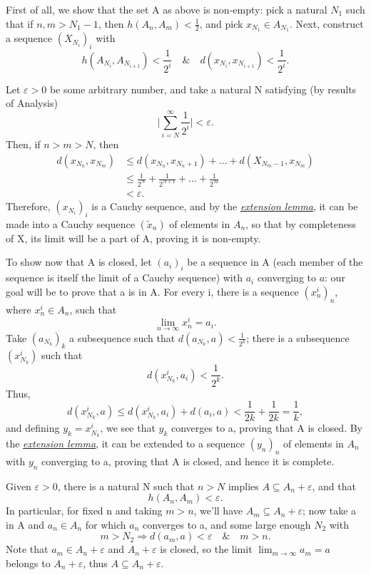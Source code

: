 \documentclass[../fractals_everywhere.tex]{subfiles}
\begin{document}
\begin{proof*}
	First of all, we show that the set A as above is non-empty: pick a natural \(N_{1}\) such that if \(n, m > N_{1}-1\), then \(h(A_{n}, A_{m}) < \frac{1}{2}\), and pick \(x_{N_{1}}\in A_{N_{1}}\). Next, construct a sequence \((X_{N_i})_{i}\) with
	\[
		h(A_{N_{i}}, A_{N_{i+1}}) < \frac{1}{2^{i}} \quad\&\quad d(x_{N_{i}}, x_{N_{i+1}}) < \frac{1}{2^{i}}.
	\]

	Let \(\varepsilon > 0\) be some arbitrary number, and take a natural N satisfying (by results of Analysis)
	\[
		\biggl\vert \sum\limits_{i=N}^{\infty}\frac{1}{2^{i}} \biggr\vert < \varepsilon.
	\]
	Then, if \(n > m > N\), then
	\begin{align*}
		d(x_{N_{n}}, x_{N_{m}}) & \leq d(x_{N_{n}}, x_{N_{n}+1}) + \dotsc + d(X_{N_{m}-1}, x_{N_{m}}) \\
		                        & \leq \frac{1}{2^{N}} + \frac{1}{2^{N+1}}+\dotsc +\frac{1}{2^{M}}    \\
		                        & < \varepsilon .
	\end{align*}
	Therefore, \((x_{N_{i}})_{i}\) is a Cauchy sequence, and by the \hyperlink{extension_lemma}{\textit{extension lemma}}, it can be made into a Cauchy sequence \((\tilde{x}_{n})\) of elements in \(A_{n}\), so that by completeness of X, its limit will be a part of A, proving it is non-empty.

	To show now that A is closed, let \((a_{i})_{i}\) be a sequence in A (each member of the sequence is itself the limit of a Cauchy sequence) with \(a_{i}\) converging to \(a\): our goal will be to prove that a is in A. For every i, there is a sequence \((x_{n}^{i})_{n}\), where \(x_{n}^{i}\in A_{n}\), such that
	\[
		\lim_{n\to \infty}x_{n}^{i} = a_{i}.
	\]
	Take \((a_{N_{k}})_{k}\) a subsequence such that \(\displaystyle d(a_{N_{k}}, a) < \frac{1}{2^{k}}\); there is a subsequence \((x_{N_{k}}^{i})\) such that
	\[
		d(x_{N_{k}}^{i}, a_{i}) < \frac{1}{2^{k}}.
	\]
	Thus,
	\[
		d(x_{N_{k}}^{i}, a) \leq d(x_{N_{k}}^{i}, a_{i}) + d(a_{i}, a) < \frac{1}{2k} + \frac{1}{2k} = \frac{1}{k},
	\]
	and defining \(y_{k} = x_{N_{k}}^{i}\), we see that \(y_{k}\) converges to a, proving that A is closed. By the \hyperlink{extension_lemma}{\textit{extension lemma}}, it can be extended to a sequence \((y_{n})_{n}\) of elements in \(A_{n}\) with \(y_{n}\) converging to a, proving that A is closed, and hence it is complete.

	Given \(\varepsilon > 0\), there is a natural N such that \(n > N\) implies \(A\subseteq A_{n}+\varepsilon \), and that
	\[
		h(A_{n}, A_{m}) < \varepsilon .
	\]
	In particular, for fixed n and taking \(m > n\), we'll have \(A_{m}\subseteq A_{n}+\varepsilon \); now take a in A and \(a_{n}\in A_{n}\) for which \(a_{n}\) converges to a, and some large enough \(N_{2}\) with
	\[
		m > N_{2} \Rightarrow d(a_{m}, a) < \varepsilon \quad\&\quad m>n.
	\]
	Note that \(a_{m}\in A_{n}+\varepsilon \) and \(A_{n}+\varepsilon \) is closed, so the limit \(\lim_{m\to \infty}a_{m} = a\) belongs to \(A_{n}+\varepsilon \), thus \(A\subseteq A_{n}+\varepsilon \).


\end{proof*}
\end{document}
